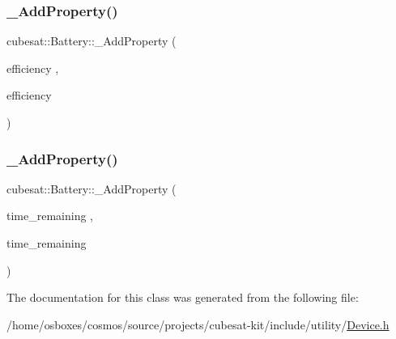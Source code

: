 \mbox{\label{classcubesat_1_1Battery_a04d91c0ec695dfdedc33e5f3e4c74383}} 
\subsubsection{\texorpdfstring{\+\_\+\+Add\+Property()}{\_AddProperty()}\hspace{0.1cm}{\footnotesize\ttfamily [10/11]}}
{\footnotesize\ttfamily cubesat\+::\+Battery\+::\+\_\+\+Add\+Property (\begin{DoxyParamCaption}\item[{efficiency}]{,  }\item[{efficiency}]{ }\end{DoxyParamCaption})}

\mbox{\label{classcubesat_1_1Battery_a0fb694ff309d0be2bbb1fc4d362c2984}} 
\subsubsection{\texorpdfstring{\+\_\+\+Add\+Property()}{\_AddProperty()}\hspace{0.1cm}{\footnotesize\ttfamily [11/11]}}
{\footnotesize\ttfamily cubesat\+::\+Battery\+::\+\_\+\+Add\+Property (\begin{DoxyParamCaption}\item[{time\+\_\+remaining}]{,  }\item[{time\+\_\+remaining}]{ }\end{DoxyParamCaption})}



The documentation for this class was generated from the following file\+:\begin{DoxyCompactItemize}
\item 
/home/osboxes/cosmos/source/projects/cubesat-\/kit/include/utility/\hyperlink{Device_8h}{Device.\+h}\end{DoxyCompactItemize}
